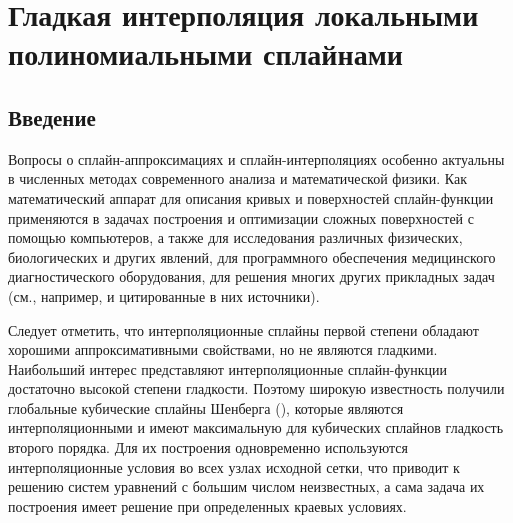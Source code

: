 \section{Гладкая интерполяция локальными полиномиальными сплайнами}
%
%
%
%
%
%

\subsection{Введение}

Вопросы о сплайн-аппроксимациях и сплайн-интерполяциях особенно актуальны
в численных методах современного анализа и математической физики.
Как математический аппарат для описания кривых и поверхностей сплайн-функции
применяются в задачах построения и оптимизации сложных поверхностей с помощью
компьютеров, а также для исследования различных физических, биологических и
других явлений,  для программного обеспечения медицинского диагностического
оборудования, для решения многих других прикладных задач
(см., например,\cite{ark-4,ark-5,ark-6,ark-7} и цитированные в них источники).

Следует отметить, что интерполяционные сплайны первой степени обладают
хорошими аппроксимативными свойствами, но не являются гладкими. Наибольший
интерес представляют интерполяционные сплайн-функции достаточно высокой
степени гладкости. Поэтому широкую известность получили глобальные
кубические сплайны Шенберга (\cite{ark-4}), которые являются интерполяционными и
имеют максимальную для кубических сплайнов гладкость второго порядка.
Для их построения одновременно используются интерполяционные условия
во всех узлах исходной сетки, что приводит к решению систем уравнений
с большим числом неизвестных, а сама задача их построения имеет решение
при определенных краевых условиях.

